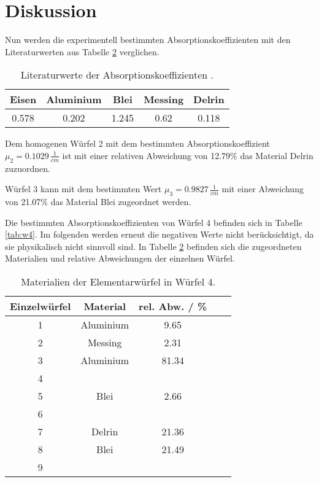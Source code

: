 \section{Diskussion}
\label{sec:Diskussion}

\noindent
Nun werden die experimentell bestimmten Absorptionskoeffizienten mit den Literaturwerten aus Tabelle \ref{tab:lit} verglichen.


\begin{table}
    \centering
    \begin{tabular}{c c c c c}
    \toprule
    Eisen & Aluminium & Blei & Messing & Delrin\\
     \midrule 
    0.578 & 0.202 & 1.245 & 0.62 & 0.118\\
\bottomrule
\end{tabular}
\caption{Literaturwerte der Absorptionskoeffizienten \cite{chemie} \cite{delrin}.}
\label{tab:lit}
\end{table}
    
\noindent
Dem homogenen Würfel 2 mit dem bestimmten Absorptionskoeffizient $\mu_2 = 0.1029 \, \frac{1}{cm}$ ist mit einer relativen Abweichung von 12.79\% das Material Delrin zuzuordnen.

\noindent
Würfel 3 kann mit dem bestimmten Wert $\mu_3 = 0.9827 \, \frac{1}{cm}$ mit einer Abweichung von 21.07\% das Material Blei zugeordnet werden.

\noindent
Die bestimmten Absorptionskoeffizienten von Würfel 4 befinden sich in Tabelle \ref{tab:w4}.
Im folgenden werden erneut die negativen Werte nicht berücksichtigt, da sie physikalisch nicht sinnvoll sind.
In Tabelle \ref{tab:lit} befinden sich die zugeordneten Materialien und relative Abweichungen der einzelnen Würfel.

\begin{table}
    \centering
    \begin{tabular}{c c c c c}
    \toprule
    Einzelwürfel & Material & rel. Abw. / \% \\
     \midrule 
    1 & Aluminium & 9.65\\
    2 & Messing & 2.31 \\
    3 & Aluminium & 81.34\\
    4 &  & \\
    5 & Blei & 2.66 \\
    6 &  & \\
    7 & Delrin &21.36\\
    8 & Blei & 21.49\\
    9 &  &\\
\bottomrule
\end{tabular}
\caption{Materialien der Elementarwürfel in Würfel 4.}
\label{tab:lit}
\end{table}

